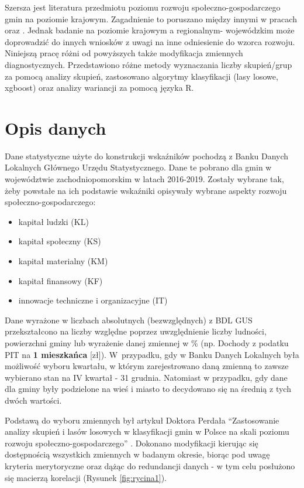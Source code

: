 \documentclass{amuthesis}
\begin{document}
Szersza jest literatura przedmiotu poziomu rozwoju społeczno-gospodarczego gmin na poziomie krajowym.
Zagadnienie to poruszano między innymi w pracach \textcite{perdal_zastosowanie} oraz \textcite{churski_teoretyczny}.
Jednak badanie na poziomie krajowym a regionalnym- wojewódzkim może doprowadzić do innych wniosków z uwagi na inne odniesienie do wzorca rozwoju.
Niniejszą pracę różni od powyższych także modyfikacja zmiennych diagnostycznych.
Przedstawiono różne metody wyznaczania liczby skupień/grup za pomocą analizy skupień, zastosowano algorytmy klasyfikacji (lasy losowe, xgboost) oraz analizy wariancji za pomocą języka R.

\hypertarget{dane}{%
\section{Opis danych}\label{dane}}

Dane statystyczne użyte do konstrukcji wskaźników pochodzą z Banku Danych Lokalnych Głównego Urzędu Statystycznego.
Dane te pobrano dla gmin w województwie zachodniopomorskim w latach 2016-2019.
Zostały wybrane tak, żeby powstałe na ich podstawie wskaźniki opisywały wybrane aspekty rozwoju społeczno-gospodarczego:

\begin{itemize}
\tightlist
\item
  kapitał ludzki (KL)
\item
  kapitał społeczny (KS)
\item
  kapitał materialny (KM)
\item
  kapitał finansowy (KF)
\item
  innowacje techniczne i organizacyjne (IT)
\end{itemize}

Dane wyrażone w liczbach absolutnych (bezwzględnych) z BDL GUS przekształcono na liczby względne poprzez uwzględnienie liczby ludności, powierzchni gminy lub wyrażenie danej zmiennej w \% (np. Dochody z podatku PIT na \textbf{1 mieszkańca} {[}zł{]}).
W~przypadku, gdy w Banku Danych Lokalnych była możliwość wyboru kwartału, w którym zarejestrowano daną zmienną to zawsze wybierano stan na IV kwartał - 31 grudnia.
Natomiast w przypadku, gdy dane dla gminy były podzielone na wieś i miasto to decydowano się na średnią z tych dwóch wartości.

Podstawą do wyboru zmiennych był artykuł Doktora Perdała ``Zastosowanie analizy skupień i lasów losowych w klasyfikacji gmin w Polsce na skali poziomu rozwoju społeczno-gospodarczego'' \autocite{perdal_zastosowanie}.
Dokonano modyfikacji kierując się dostępnością wszystkich zmiennych w badanym okresie, biorąc pod uwagę kryteria merytoryczne oraz dążąc do redundancji danych - w tym celu posłużono się macierzą korelacji (Rysunek \ref{fig:rycina1}).
\end{document}
